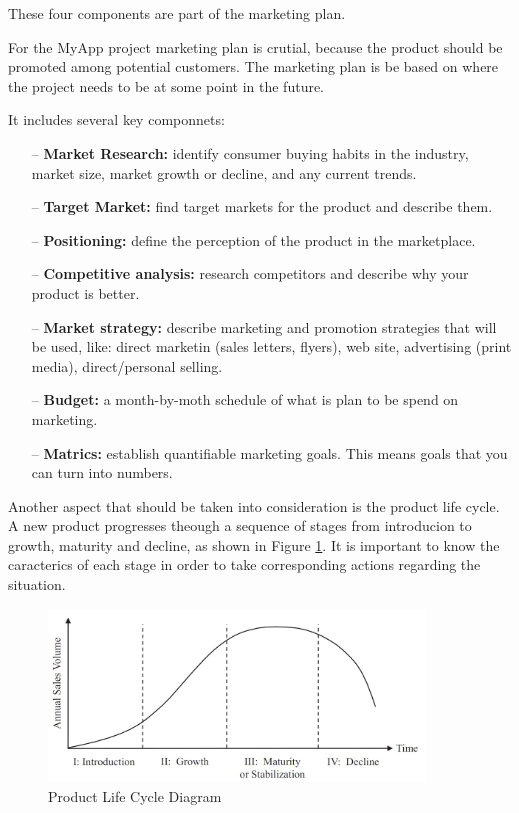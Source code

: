 These four components are part of the marketing plan.

For the MyApp project marketing plan is crutial, because the product should be promoted among potential customers. The marketing plan is be based on where the project needs to be at some point in the future.

It includes several key componnets: 
\begin{enumerate}

\item[--] \textbf{Market Research:} identify consumer buying habits in the industry, market size, market growth or decline, and any current trends.

\item[--] \textbf{Target Market:} find target markets for the product and describe them.

\item[--] \textbf{Positioning:} define the perception of the product in the marketplace.

\item[--] \textbf{Competitive analysis:} research competitors and describe why your product is better.

\item[--] \textbf{Market strategy:} describe marketing and promotion strategies that will be used, like: direct marketin (sales letters, flyers), web site, advertising (print media), direct/personal selling.

\item[--] \textbf{Budget:} a month-by-moth schedule of what is plan to be spend on marketing.

\item[--] \textbf{Matrics:} establish quantifiable marketing goals. This means goals that you can turn into numbers.

\end{enumerate}

Another aspect that should be taken into consideration is the product life cycle. A new product progresses theough a sequence of stages from introducion to growth, maturity and decline, as shown in Figure \ref{product-stage}. It is important to know the caracterics of each stage in order to take corresponding actions regarding the situation.

\begin{figure}[!ht]
\centering
\includegraphics[width=10cm]{product-life-cycle}
\caption{Product Life Cycle Diagram\cite{prodcutFigure}}\label{product-stage}
\end{figure}


